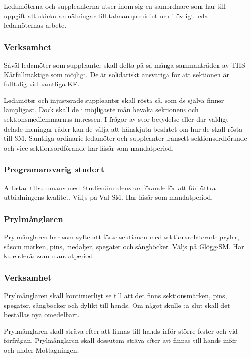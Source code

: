 \documentclass[a4paper,12pt]{article}
\begin{document}
Ledamöterna och suppleanterna utser inom sig en samordnare som har till uppgift att skicka anmälningar till talmanspresidiet och i övrigt leda ledamöternas arbete.

\subsubsection{Verksamhet}

Såväl ledamöter som suppleanter skall delta på så många sammanträden av THS Kårfullmäktige som möjligt. De är solidariskt ansvariga för att sektionen är fulltalig vid samtliga KF.

Ledamöter och injusterade suppleanter skall rösta så, som de själva finner lämpligast. Dock skall de i möjligaste mån bevaka sektionens och sektionsmedlemmarnas intressen. I frågor av stor betydelse eller där väldigt delade meningar råder kan de välja att hänskjuta beslutet om hur de skall rösta till SM. Samtliga ordinarie ledamöter och suppleanter frånsett sektionsordförande och vice sektionsordförande har läsår som mandatperiod.

\subsubsection{Programansvarig student}

Arbetar tillsammans med Studienämndens ordförande för att förbättra utbildningens kvalitet. Väljs på Val-SM. Har läsår som mandatperiod.

\subsubsection{Prylmånglaren}

Prylmånglaren har som syfte att förse sektionen med sektionsrelaterade prylar, såsom märken, pins, medaljer, spegater och sångböcker. Väljs på Glögg-SM. Har kalenderår som mandatperiod.

\subsubsection{Verksamhet}

Prylmånglaren skall kontinuerligt se till att det finns sektionsmärken, pins, spegater, sångböcker och dylikt till hands. Om något skulle ta slut skall det beställas nya omedelbart.

Prylmånglaren skall sträva efter att finnas till hands inför större fester och vid förfrågan. Prylmånglaren skall dessutom sträva efter att finnas till hands inför och under Mottagningen.
\end{document}
